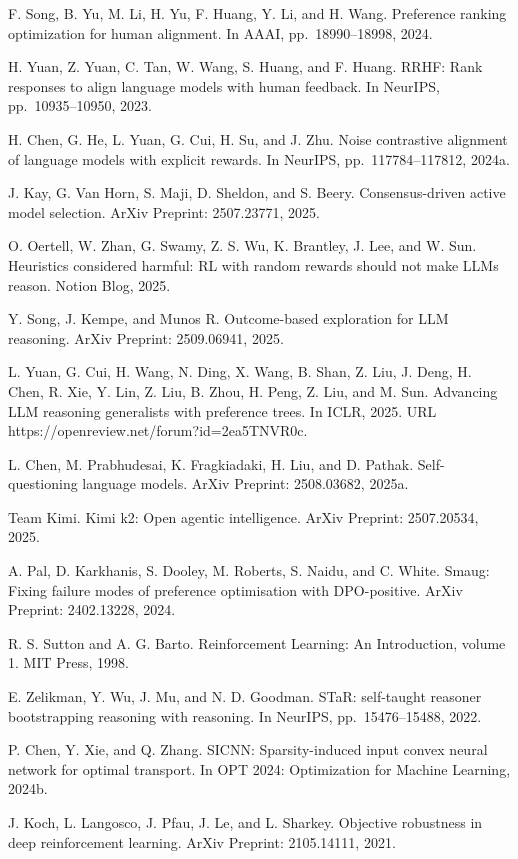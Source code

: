 \documentclass[
  10
]{article}
\begin{document}
F. Song, B. Yu, M. Li, H. Yu, F. Huang, Y. Li, and H. Wang. Preference
ranking optimization for human alignment. In AAAI, pp.~18990--18998,
2024.

H. Yuan, Z. Yuan, C. Tan, W. Wang, S. Huang, and F. Huang. RRHF: Rank
responses to align language models with human feedback. In NeurIPS,
pp.~10935--10950, 2023.

H. Chen, G. He, L. Yuan, G. Cui, H. Su, and J. Zhu. Noise contrastive
alignment of language models with explicit rewards. In NeurIPS,
pp.~117784--117812, 2024a.

J. Kay, G. Van Horn, S. Maji, D. Sheldon, and S. Beery. Consensus-driven
active model selection. ArXiv Preprint: 2507.23771, 2025.

O. Oertell, W. Zhan, G. Swamy, Z. S. Wu, K. Brantley, J. Lee, and W.
Sun. Heuristics considered harmful: RL with random rewards should not
make LLMs reason. Notion Blog, 2025.

Y. Song, J. Kempe, and Munos R. Outcome-based exploration for LLM
reasoning. ArXiv Preprint: 2509.06941, 2025.

L. Yuan, G. Cui, H. Wang, N. Ding, X. Wang, B. Shan, Z. Liu, J. Deng, H.
Chen, R. Xie, Y. Lin, Z. Liu, B. Zhou, H. Peng, Z. Liu, and M. Sun.
Advancing LLM reasoning generalists with preference trees. In ICLR,
2025. URL https://openreview.net/forum?id=2ea5TNVR0c.

L. Chen, M. Prabhudesai, K. Fragkiadaki, H. Liu, and D. Pathak.
Self-questioning language models. ArXiv Preprint: 2508.03682, 2025a.

Team Kimi. Kimi k2: Open agentic intelligence. ArXiv Preprint:
2507.20534, 2025.

A. Pal, D. Karkhanis, S. Dooley, M. Roberts, S. Naidu, and C. White.
Smaug: Fixing failure modes of preference optimisation with
DPO-positive. ArXiv Preprint: 2402.13228, 2024.

R. S. Sutton and A. G. Barto. Reinforcement Learning: An Introduction,
volume 1. MIT Press, 1998.

E. Zelikman, Y. Wu, J. Mu, and N. D. Goodman. STaR: self-taught reasoner
bootstrapping reasoning with reasoning. In NeurIPS, pp.~15476--15488,
2022.

P. Chen, Y. Xie, and Q. Zhang. SICNN: Sparsity-induced input convex
neural network for optimal transport. In OPT 2024: Optimization for
Machine Learning, 2024b.

J. Koch, L. Langosco, J. Pfau, J. Le, and L. Sharkey. Objective
robustness in deep reinforcement learning. ArXiv Preprint: 2105.14111,
2021.
\end{document}
